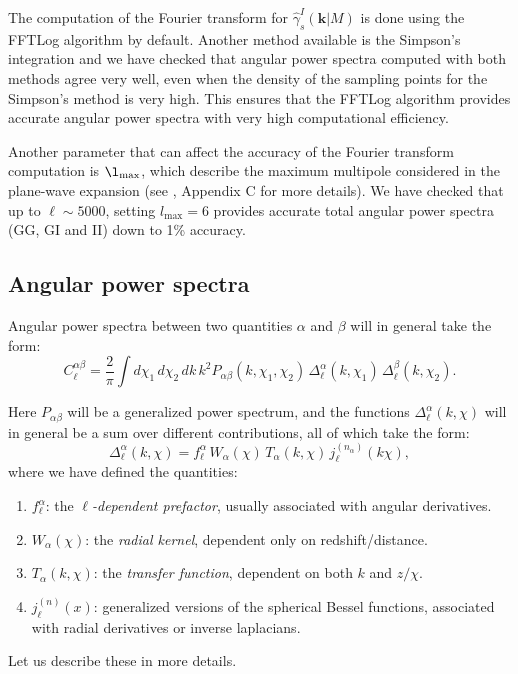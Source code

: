 \documentclass[\docopts]{\docclass}
\begin{document}
The computation of the Fourier transform for $\hat{\gamma}_s^I(\mathbf{k}|M)$ is done using the FFTLog algorithm by default. Another method available is the Simpson's integration and we have checked that angular power spectra computed with both methods agree very well, even when the density of the sampling points for the Simpson's method is very high. This ensures that the FFTLog algorithm provides accurate angular power spectra with very high computational efficiency.

Another parameter that can affect the accuracy of the Fourier transform computation is $\l_\mathrm{max}$, which describe the maximum multipole considered in the plane-wave expansion (see \cite{Fortuna2021}, Appendix C for more details). We have checked that up to $\ell\sim5000$, setting $l_\mathrm{max}=6$ provides accurate total angular power spectra (GG, GI and II) down to 1\% accuracy. 


\subsection{Angular power spectra}
\label{sec:cl}

Angular power spectra between two quantities $\alpha$ and $\beta$ will in general take the form:
\begin{equation}
  C^{\alpha\beta}_\ell=\frac{2}{\pi}\int d\chi_1\,d\chi_2\,dk\,k^2 P_{\alpha\beta}(k,\chi_1,\chi_2)\,\Delta^\alpha_\ell(k,\chi_1)\,\Delta^\beta_\ell(k,\chi_2).
\end{equation}

Here $P_{\alpha\beta}$ will be a generalized power spectrum, and the functions $\Delta^\alpha_\ell(k,\chi)$ will in general be a sum over
different contributions, all of which take the form:
\begin{equation}\label{eq:generalized_tracer}
  \Delta^\alpha_\ell(k,\chi)=f^\alpha_\ell\,W_\alpha(\chi)\,T_\alpha(k,\chi)\,j^{(n_\alpha)}_\ell(k\chi),
\end{equation}
where we have defined the quantities:
\begin{enumerate}
 \item $f^\alpha_\ell$: the \emph{$\ell$-dependent prefactor}, usually associated with angular derivatives.
 \item $W_\alpha(\chi)$: the \emph{radial kernel}, dependent only on redshift/distance.
 \item $T_\alpha(k,\chi)$: the \emph{transfer function}, dependent on both $k$ and $z/\chi$.
 \item $j^{(n)}_\ell(x)$: generalized versions of the spherical Bessel functions, associated with radial derivatives or inverse laplacians.
\end{enumerate}
Let us describe these in more details.
\end{document}

